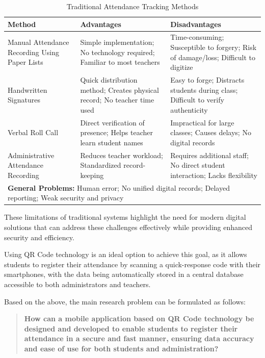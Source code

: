 \documentclass[12pt,a4paper]{report}
\begin{document}
\begin{table}[htbp]
\centering
\caption{Traditional Attendance Tracking Methods}
\label{tab:traditional-attendance}
\begin{tabular}{|p{3cm}|p{5cm}|p{5cm}|}
\hline
\textbf{Method} & \textbf{Advantages} & \textbf{Disadvantages} \\
\hline
Manual Attendance Recording Using Paper Lists & 
Simple implementation; No technology required; Familiar to most teachers & 
Time-consuming; Susceptible to forgery; Risk of damage/loss; Difficult to digitize \\
\hline
Handwritten Signatures & 
Quick distribution method; Creates physical record; No teacher time used & 
Easy to forge; Distracts students during class; Difficult to verify authenticity \\
\hline
Verbal Roll Call & 
Direct verification of presence; Helps teacher learn student names & 
Impractical for large classes; Causes delays; No digital records \\
\hline
Administrative Attendance Recording & 
Reduces teacher workload; Standardized record-keeping & 
Requires additional staff; No direct student interaction; Lacks flexibility \\
\hline
\multicolumn{3}{|p{13cm}|}{\textbf{General Problems:} Human error; No unified digital records; Delayed reporting; Weak security and privacy} \\
\hline
\end{tabular}
\end{table}

\vspace{7cm}

These limitations of traditional systems highlight the need for modern digital solutions that can address these challenges effectively while providing enhanced security and efficiency.

Using QR Code technology is an ideal option to achieve this goal, as it allows students to register their attendance by scanning a quick-response code with their smartphones, with the data being automatically stored in a central database accessible to both administrators and teachers.

Based on the above, the main research problem can be formulated as follows:
\begin{quote}
\textbf{How can a mobile application based on QR Code technology be designed and developed to enable students to register their attendance in a secure and fast manner, ensuring data accuracy and ease of use for both students and administration?}
\end{quote}
\end{document}
